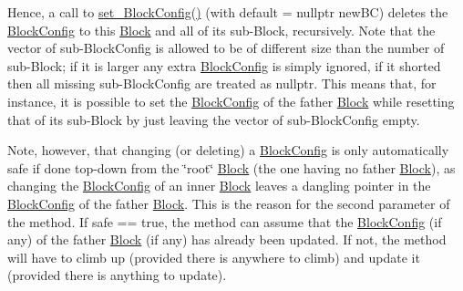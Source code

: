 Hence, a call to \mbox{\hyperlink{class_s_m_spp__di__unipi__it_1_1_block_a18d411b740a47db00d15083c5c7ef2ba}{set\+\_\+\+Block\+Config()}} (with default = nullptr new\+BC) deletes the \mbox{\hyperlink{class_s_m_spp__di__unipi__it_1_1_block_config}{Block\+Config}} to this \mbox{\hyperlink{class_s_m_spp__di__unipi__it_1_1_block}{Block}} and all of its sub-\/\+Block, recursively. Note that the vector of sub-\/\+Block\+Config is allowed to be of different size than the number of sub-\/\+Block; if it is larger any extra \mbox{\hyperlink{class_s_m_spp__di__unipi__it_1_1_block_config}{Block\+Config}} is simply ignored, if it shorted then all missing sub-\/\+Block\+Config are treated as nullptr. This means that, for instance, it is possible to set the \mbox{\hyperlink{class_s_m_spp__di__unipi__it_1_1_block_config}{Block\+Config}} of the father \mbox{\hyperlink{class_s_m_spp__di__unipi__it_1_1_block}{Block}} while resetting that of its sub-\/\+Block by just leaving the vector of sub-\/\+Block\+Config empty.

Note, however, that changing (or deleting) a \mbox{\hyperlink{class_s_m_spp__di__unipi__it_1_1_block_config}{Block\+Config}} is only automatically safe if done top-\/down from the \char`\"{}root\char`\"{} \mbox{\hyperlink{class_s_m_spp__di__unipi__it_1_1_block}{Block}} (the one having no father \mbox{\hyperlink{class_s_m_spp__di__unipi__it_1_1_block}{Block}}), as changing the \mbox{\hyperlink{class_s_m_spp__di__unipi__it_1_1_block_config}{Block\+Config}} of an inner \mbox{\hyperlink{class_s_m_spp__di__unipi__it_1_1_block}{Block}} leaves a dangling pointer in the \mbox{\hyperlink{class_s_m_spp__di__unipi__it_1_1_block_config}{Block\+Config}} of the father \mbox{\hyperlink{class_s_m_spp__di__unipi__it_1_1_block}{Block}}. This is the reason for the second parameter of the method. If safe == true, the method can assume that the \mbox{\hyperlink{class_s_m_spp__di__unipi__it_1_1_block_config}{Block\+Config}} (if any) of the father \mbox{\hyperlink{class_s_m_spp__di__unipi__it_1_1_block}{Block}} (if any) has already been updated. If not, the method will have to climb up (provided there is anywhere to climb) and update it (provided there is anything to update). \mbox{\label{class_s_m_spp__di__unipi__it_1_1_block_ae1e61f1d3f7185b6824f02488901a0ad}} 
